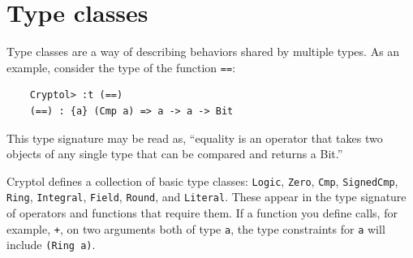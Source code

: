 \section{Type classes}\indTypeClasses
\label{sec:type-classes}



Type classes are a way of describing behaviors shared by multiple
types.  As an example, consider the type of the function {\tt ==}:
\begin{Verbatim}
    Cryptol> :t (==)
    (==) : {a} (Cmp a) => a -> a -> Bit
\end{Verbatim}

This type signature may be read as, ``equality is an operator that
takes two objects of any single type that can be compared and returns
a Bit.''

Cryptol defines a collection of basic type classes: \texttt{Logic},
\texttt{Zero}, \texttt{Cmp}, \texttt{SignedCmp}, \texttt{Ring},
\texttt{Integral}, \texttt{Field}, \texttt{Round}, and
\texttt{Literal}. These appear in the type signature of operators and
functions that require them. If a function you define calls, for
example, \texttt{+}, on two arguments both of type \texttt{a}, the
type constraints for \texttt{a} will include \texttt{(Ring a)}.

